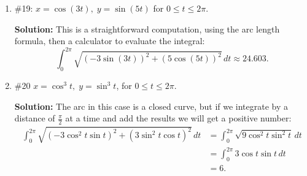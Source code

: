 \documentclass[11pt,letterpaper]{article}
\begin{document}
\begin{enumerate}
\item \#19: $x=\cos{(3t)},\;y=\sin{(5t)}$ for $0\leq t\leq 2\pi$.

{\bf Solution:} This is a straightforward computation, using the arc length formula, then a calculator to evaluate the integral:
\[\int_0^{2\pi}\sqrt{(-3\sin{(3t)})^2+(5\cos{(5t)})^2}\,dt\approx 24.603.\]

\item \#20 $x=\cos^3t,\;y=\sin^3t$, for $0\leq t\leq 2\pi$.

{\bf Solution:} The arc in this case is a closed curve, but if we integrate by a distance of $\frac{\pi}{2}$ at a time and add the results we will get a positive number:
\begin{align*}
\int_0^{2\pi}\sqrt{(-3\cos^2t\sin{t})^2+(3\sin^2t\cos{t})^2}\,dt &= \int_0^{2\pi}\sqrt{9\cos^2t\sin^2t}\,dt \\
&= \int_0^{2\pi}3\cos{t}\sin{t}\,dt \\
&= 6.
\end{align*}

\end{enumerate}
\end{document}
